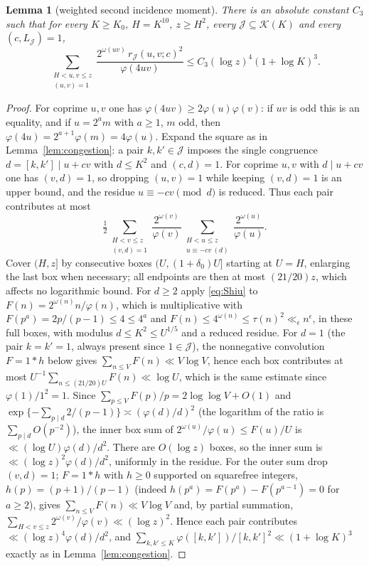 \documentclass[10pt,reqno]{amsart}
\newtheorem{lemma}[theorem]{Lemma}
\theoremstyle{remark}
\newcommand{\K}{\mathcal K}
\newcommand{\J}{\mathcal J}
\begin{document}
\begin{lemma}[weighted second incidence moment]\label{lem:wsecond}
There is an absolute constant $C_3$ such that for every $K\geq K_0$,
$H=K^{10}$, $z\geq H^2$, every $\J\subseteq\K(K)$ and every
$(c,L_{\J})=1$,
\begin{equation}\label{eq:wsecond}
 \sum_{\substack{H<u,v\leq z\\(u,v)=1}}
 \frac{2^{\omega(uv)}\,r_{\J}(u,v;c)^2}{\varphi(4uv)}
 \leq C_3(\log z)^4(1+\log K)^3.
\end{equation}
\end{lemma}
\begin{proof}
For coprime $u,v$ one has $\varphi(4uv)\geq2\varphi(u)\varphi(v)$: if
$uv$ is odd this is an equality, and if $u=2^am$ with $a\geq1$, $m$ odd,
then $\varphi(4u)=2^{a+1}\varphi(m)=4\varphi(u)$.  Expand the square as
in Lemma~\ref{lem:congestion}: a pair $k,k'\in\J$ imposes the single
congruence $d=[k,k']\mid u+cv$ with $d\leq K^2$ and $(c,d)=1$.  For
coprime $u,v$ with $d\mid u+cv$ one has $(v,d)=1$, so dropping $(u,v)=1$
while keeping $(v,d)=1$ is an upper bound, and the residue
$u\equiv-cv\pmod d$ is reduced.  Thus each pair contributes at most
\[
 \tfrac12\sum_{\substack{H<v\leq z\\(v,d)=1}}\frac{2^{\omega(v)}}{\varphi(v)}
 \sum_{\substack{H<u\leq z\\u\equiv-cv\ (d)}}\frac{2^{\omega(u)}}{\varphi(u)}.
\]
Cover $(H,z]$ by consecutive boxes $(U,(1+\delta_0)U]$ starting at
$U=H$, enlarging the last box when necessary; all endpoints are then at
most $(21/20)z$, which affects no logarithmic bound.  For $d\geq2$ apply
\eqref{eq:Shiu} to $F(n)=2^{\omega(n)}n/\varphi(n)$, which is
multiplicative with $F(p^a)=2p/(p-1)\leq4\leq4^a$ and
$F(n)\leq4^{\omega(n)}\leq\tau(n)^2\ll_\epsilon n^\epsilon$, in these full
boxes, with modulus $d\leq K^2\leq U^{1/5}$ and a reduced residue.  For
$d=1$ (the pair $k=k'=1$, always present since $1\in\J$), the
nonnegative convolution $F=1*h$ below gives $\sum_{n\leq V}F(n)\ll V\log V$,
hence each box contributes at most $U^{-1}\sum_{n\leq(21/20)U}F(n)\ll\log U$,
which is the same estimate since $\varphi(1)/1^2=1$.  Since
$\sum_{p\leq V}F(p)/p=2\log\log V+O(1)$ and
$\exp\{-\sum_{p\mid d}2/(p-1)\}\asymp(\varphi(d)/d)^2$ (the logarithm
of the ratio is $\sum_{p\mid d}O(p^{-2})$), the inner box sum of
$2^{\omega(u)}/\varphi(u)\leq F(u)/U$ is $\ll(\log U)\varphi(d)/d^2$.
There are $O(\log z)$ boxes, so the inner sum is
$\ll(\log z)^2\varphi(d)/d^2$, uniformly in the residue.  For the outer
sum drop $(v,d)=1$; $F=1*h$ with $h\geq0$ supported on squarefree
integers, $h(p)=(p+1)/(p-1)$ (indeed $h(p^a)=F(p^a)-F(p^{a-1})=0$ for
$a\geq2$), gives $\sum_{n\leq V}F(n)\ll V\log V$ and,
by partial summation, $\sum_{H<v\leq z}2^{\omega(v)}/\varphi(v)\ll(\log z)^2$.
Hence each pair contributes $\ll(\log z)^4\varphi(d)/d^2$, and
$\sum_{k,k'\leq K}\varphi([k,k'])/[k,k']^2\ll(1+\log K)^3$ exactly as in
Lemma~\ref{lem:congestion}.
\end{proof}
\end{document}
